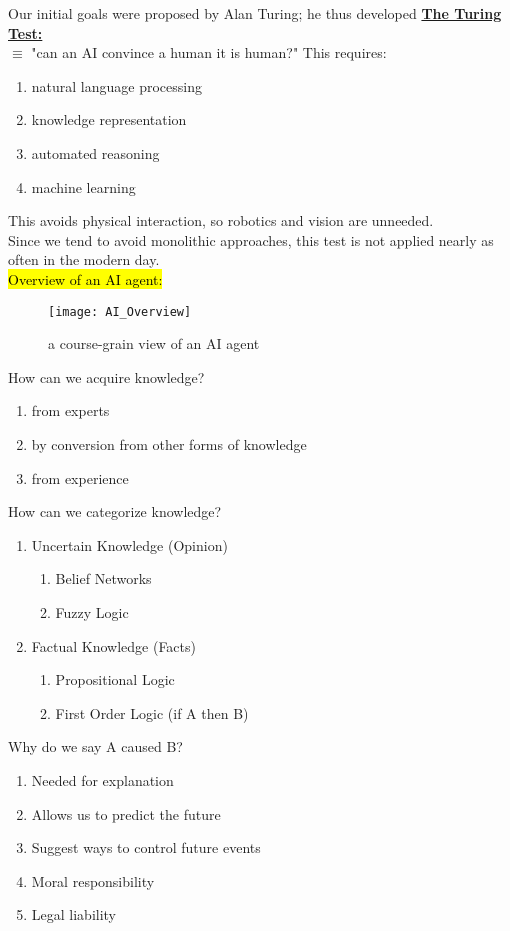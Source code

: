 \documentclass[../../lecture_notes.tex]{subfiles}
\begin{document}
\noindent Our initial goals were proposed by Alan Turing; he thus developed \textbf{\underline{The Turing Test:}}\\
\indent $\equiv$ "can an AI convince a human it is human?" This requires:
	\begin{enumerate} [itemsep=0mm]
		\item natural language processing
		\item knowledge representation
		\item automated reasoning
		\item machine learning
	\end{enumerate}
\noindent This avoids physical interaction, so robotics and vision are unneeded.\\
Since we tend to avoid monolithic approaches, this test is not applied nearly as often in the modern day.\\

\noindent \hl{Overview of an AI agent:}
\begin{figure}[H]
	\centering
	\texttt{[image: AI\_Overview]}
	\caption{a course-grain view of an AI agent}
\end{figure}

\noindent How can we acquire knowledge?
	\begin{enumerate} [itemsep=0mm]
		\item from experts
		\item by conversion from other forms of knowledge
		\item from experience
	\end{enumerate}

How can we categorize knowledge?
\begin{enumerate} [itemsep=0mm]
	\item Uncertain Knowledge (Opinion)
		\begin{enumerate} [itemsep=0mm]
			\item Belief Networks
			\item Fuzzy Logic
		\end{enumerate}
	\item Factual Knowledge (Facts)
		\begin{enumerate} [itemsep=0mm]
			\item Propositional Logic
			\item First Order Logic (if A then B)
		\end{enumerate}
\end{enumerate} \medskip
        

Why do we say A caused B?
\begin{enumerate} [itemsep=0mm]
	\item Needed for explanation
	\item Allows us to predict the future
	\item Suggest ways to control future events
	\item Moral responsibility
	\item Legal liability
\end{enumerate} \medskip
\end{document}
